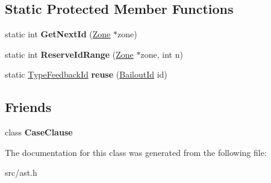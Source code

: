 \subsection*{Static Protected Member Functions}
\begin{DoxyCompactItemize}
\item 
\hypertarget{classv8_1_1internal_1_1_ast_node_ad4b6491530b5494b7b28d799f3f72d66}{}static int {\bfseries Get\+Next\+Id} (\hyperlink{classv8_1_1internal_1_1_zone}{Zone} $\ast$zone)\label{classv8_1_1internal_1_1_ast_node_ad4b6491530b5494b7b28d799f3f72d66}

\item 
\hypertarget{classv8_1_1internal_1_1_ast_node_a3b30c5cbd3332634f452dbebe5f1ffc2}{}static int {\bfseries Reserve\+Id\+Range} (\hyperlink{classv8_1_1internal_1_1_zone}{Zone} $\ast$zone, int n)\label{classv8_1_1internal_1_1_ast_node_a3b30c5cbd3332634f452dbebe5f1ffc2}

\item 
\hypertarget{classv8_1_1internal_1_1_ast_node_a60ba1b9f98ba84982363f4f462021834}{}static \hyperlink{classv8_1_1internal_1_1_type_feedback_id}{Type\+Feedback\+Id} {\bfseries reuse} (\hyperlink{classv8_1_1internal_1_1_bailout_id}{Bailout\+Id} id)\label{classv8_1_1internal_1_1_ast_node_a60ba1b9f98ba84982363f4f462021834}

\end{DoxyCompactItemize}
\subsection*{Friends}
\begin{DoxyCompactItemize}
\item 
\hypertarget{classv8_1_1internal_1_1_ast_node_a9d0fc316f19a46adb02ecfc40558a027}{}class {\bfseries Case\+Clause}\label{classv8_1_1internal_1_1_ast_node_a9d0fc316f19a46adb02ecfc40558a027}

\end{DoxyCompactItemize}


The documentation for this class was generated from the following file\+:\begin{DoxyCompactItemize}
\item 
src/ast.\+h\end{DoxyCompactItemize}
